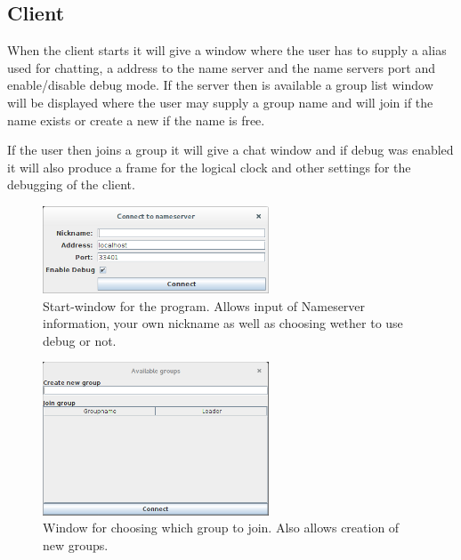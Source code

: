 \subsection{Client}
When the client starts it will give a window where the user has to supply a alias used for chatting, a address to the name server and the name servers port and enable/disable debug mode.
If the server then is available a group list window will be displayed where the user may supply a group name and will join if the name exists or create a new if the name is free. 

If the user then joins a group it will give a chat window and if debug was enabled it will also produce a frame for the logical clock and other settings for the debugging of the client.

\begin{figure}[h!]
\centering
\includegraphics[width=0.6\textwidth]{Pictures/login}
\caption{Start-window for the program. Allows input of Nameserver information, your own nickname as well as choosing wether to use debug or not. }
\end{figure}

\begin{figure}[h!]
\centering
\includegraphics[width=0.6\textwidth]{Pictures/groupChoose}
\caption{Window for choosing which group to join. Also allows creation of new groups. }
\end{figure}

